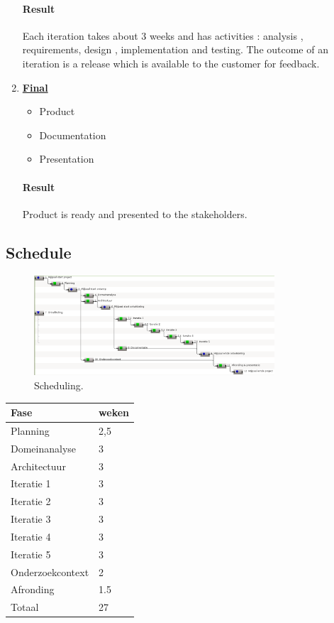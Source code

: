 \begin{enumerate}
	\paragraph{Result}
	Each iteration takes about 3 weeks and has activities : analysis , requirements, design , implementation and testing. The outcome of an iteration is a release which is available to the customer for feedback.  
	
	\item \underline{\textbf{Final}}
	\begin{itemize}
		\item Product
		\item Documentation
		\item Presentation
	\end{itemize}
	\paragraph{Result}
	Product is ready and presented to the stakeholders.
\end{enumerate}

\subsection{Schedule}
  

  \begin{figure}
  	\centering
  	\includegraphics[width=0.8\textwidth,natwidth=1306,natheight=543]{Gantt.png}
  	\caption{\label{fig:Gantt Chart}Scheduling.}
  \end{figure}

\begin{tabular}{ll}\hline
{\bf Fase}    & {\bf weken}\\\hline
Planning             & 2,5 \\

Domeinanalyse        & 3 \\
Architectuur         & 3 \\

Iteratie 1           & 3 \\
Iteratie 2           & 3 \\
Iteratie 3           & 3 \\
Iteratie 4           & 3 \\
Iteratie 5           & 3 \\

Onderzoekcontext     &	2 \\

Afronding	     & 1.5 \\
\hline
Totaal               & 27 \\
\end{tabular}



